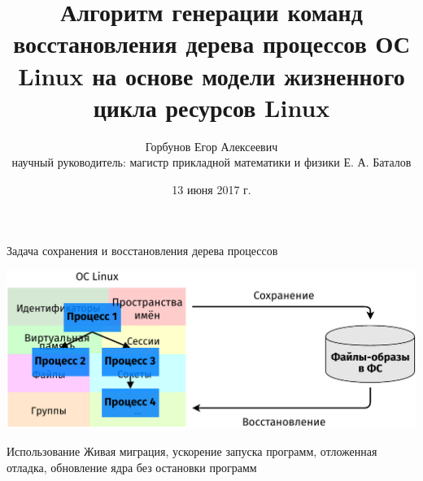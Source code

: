 


\title{Алгоритм генерации команд восстановления дерева процессов ОС Linux на основе модели жизненного цикла ресурсов Linux}
\author[Егор Горбунов]{
	Горбунов Егор Алексеевич\\
	{\scriptsize научный руководитель: магистр прикладной математики и физики Е. А. Баталов}
}
\date{13 июня 2017 г.}


\maketitle

\begin{frame}{Задача сохранения и восстановления дерева процессов}
\begin{center}
\includegraphics[width=\textwidth]{fig/restore-checkpoint.pdf}
\end{center}

\begin{block}{Использование}
Живая миграция, ускорение запуска программ, отложенная отладка, обновление ядра без остановки программ
\end{block}
\end{frame}

